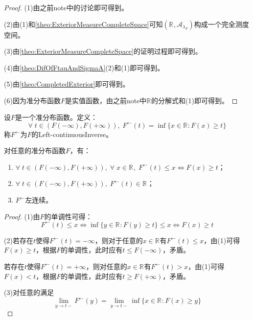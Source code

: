 \begin{proof}
	(1)由之前note中的讨论即可得到。\par
	(2)由(1)和\cref{theo:ExteriorMeasureCompleteSpace}可知$(\mathbb{R}^{},\mathscr{A}_{\lambda_F})$构成一个完全测度空间。\par
	(3)由\cref{theo:ExteriorMeasureCompleteSpace}的证明过程即可得到。\par
	(4)由\cref{theo:DifOfFtauAndSigmaA}(2)和(1)即可得到。\par
	(5)由\cref{theo:CompletedExterior}即可得到。\par
	(6)因为准分布函数$F$是实值函数，由之前note中$\mathbb{R}^{}$的分解式和(1)即可得到。
\end{proof}
\begin{definition}
	设$F$是一个准分布函数。定义：
	\begin{equation*}
		\forall\;t\in(F(-\infty),F(+\infty)),\;F^{\leftarrow}(t)=\inf\{x\in\mathbb{R}^{}:F(x)\geqslant t\}
	\end{equation*}
	称$F^{\leftarrow}$为$F$的\gls{Left-continuousInverse}。
\end{definition}
\begin{property}\label{prop:LeftcontinuousInverse}
	对任意的准分布函数$F$，有：
	\begin{enumerate}
		\item $\forall\;t\in(F(-\infty),F(+\infty)),\;\forall\;x\in\mathbb{R}^{},\;F^{\leftarrow}(t)\leqslant x\Leftrightarrow F(x)\geqslant t$；
		\item $\forall\;t\in(F(-\infty),F(+\infty)),\;F^{\leftarrow}(t)\in\mathbb{R}^{}$；
		\item $F^{\leftarrow}$左连续。
	\end{enumerate}
\end{property}
\begin{proof}
	(1)由$F$的单调性可得：
	\begin{equation*}
		F^{\leftarrow}(t)\leqslant x\Leftrightarrow\inf\{y\in\mathbb{R}^{}:F(y)\geqslant t\}\leqslant x\Leftrightarrow F(x)\geqslant t
	\end{equation*}\par
	(2)若存在$t$使得$F^{\leftarrow}(t)=-\infty$，则对于任意的$x\in\mathbb{R}^{}$有$F^{\leftarrow}(t)\leqslant x$，由(1)可得$F(x)\geqslant t$，根据$F$的单调性，此时应有$t\leqslant F(-\infty)$，矛盾。\par
	若存在$t$使得$F^{\leftarrow}(t)=+\infty$，则对任意的$x\in\mathbb{R}^{}$有$F^{\leftarrow}(t)>x$，由(1)可得$F(x)<t$，根据$F$的单调性，此时应有$t\geqslant F(+\infty)$，矛盾。\par
	(3)对任意的满足
	\begin{equation*}
		\lim_{y\to t-}F^{\leftarrow}(y)=\lim_{y\to t-}\inf\{x\in\mathbb{R}^{}:F(x)\geqslant y\}
	\end{equation*}\par
\end{proof}
